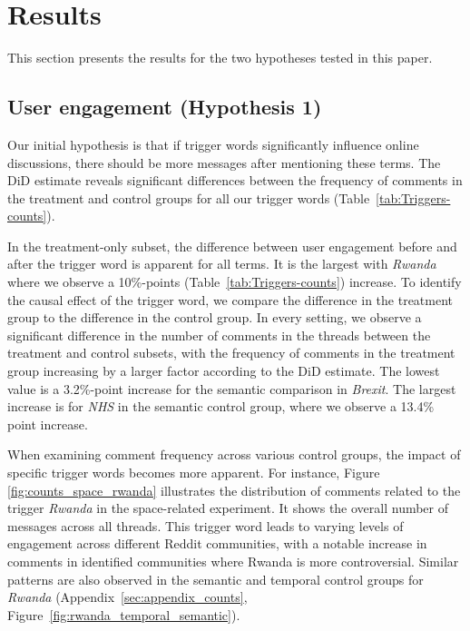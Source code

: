 \section{Results}

This section presents the results for the two hypotheses tested in this paper.

\subsection{User engagement (Hypothesis 1)}
Our initial hypothesis is that if trigger words significantly influence online discussions, there should be more messages after mentioning these terms. The DiD estimate reveals significant differences between the frequency of comments in the treatment and control groups for all our trigger words (Table~\ref{tab:Triggers-counts}).  




In the treatment-only subset, the difference between user engagement before and after the trigger word is apparent for all terms. It is the largest with \textit{Rwanda} where we observe a 10\%-points (Table~\ref{tab:Triggers-counts}) increase. To identify the causal effect of the trigger word, we compare the difference in the treatment group to the difference in the control group. In every setting, we observe a significant difference in the number of comments in the threads between the treatment and control subsets, with the frequency of comments in the treatment group increasing by a larger factor according to the DiD estimate. The lowest value is a 3.2\%-point increase for the semantic comparison in \textit{Brexit}. The largest increase is for \textit{NHS} in the semantic control group, where we observe a 13.4\% point increase.



When examining comment frequency across various control groups, the impact of specific trigger words becomes more apparent. For instance, Figure \ref{fig:counts_space_rwanda} illustrates the distribution of comments related to the trigger \textit{Rwanda} in the space-related experiment. It shows the overall number of messages across all threads. This trigger word leads to varying levels of engagement across different Reddit communities, with a notable increase in comments in identified communities where Rwanda is more controversial. Similar patterns are also observed in the semantic and temporal control groups for \textit{Rwanda} (Appendix~\ref{sec:appendix_counts}, Figure~\ref{fig:rwanda_temporal_semantic}).





